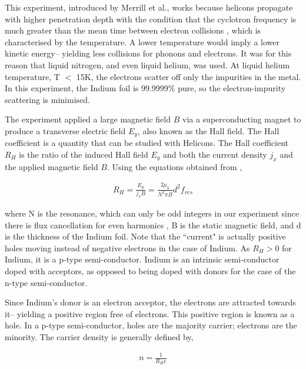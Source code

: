 This experiment, introduced by Merrill et al., works because helicons propagate with higher penetration depth with the condition that the cyclotron frequency is much greater than the mean time between electron collisions \cite{c1}, which is characterised by the temperature. A lower temperature would imply a lower kinetic energy-- yielding less collisions for phonons and electrons. It was for this reason that liquid nitrogen, and even liquid helium, was used. At liquid helium temperature, T $<$ 15K, the electrons scatter off only the impurities in the metal. In this experiment, the Indium foil is 99.9999\% pure, so the electron-impurity scattering is minimised.
\vspace{2mm}

The experiment applied a large magnetic field $B$ via a superconducting magnet to produce a transverse electric field $E_y$, also known as the Hall field. The Hall coefficient is a quantity that can be studied with Helicons. The Hall coefficient $R_H$ is the ratio of the induced Hall field $E_y$ and both the current density $j_x$ and the applied magnetic field $B$. Using the equations obtained from \cite{c4},  

\begin{align} \label{eq:hallcoeff}
R_H = \frac{E_y}{j_xB} = \frac{2\mu_0}{N^2\pi B}d^2f_{res}
\end{align}

where N is the resonance, which can only be odd integers in our experiment since there is flux cancellation for even harmonics \cite{c1}, B is the static magnetic field, and d is the thickness of the Indium foil. Note that the ``current" is actually positive holes moving instead of negative electrons in the case of Indium. As $R_H > 0$ for Indium, it is a p-type semi-conductor. Indium is an intrinsic semi-conductor doped with acceptors, as opposed to being doped with donors for the case of the n-type semi-conductor.
\vspace{2mm}

Since Indium's donor is an electron acceptor, the electrons are attracted towards it-- yielding a positive region free of electrons. This positive region is known as a hole. In a p-type semi-conductor, holes are the majority carrier; electrons are the minority. The carrier density is generally defined by, 

\begin{align} \label{eq:carrierdensity}
n = \frac{1}{R_He}
\end{align}

